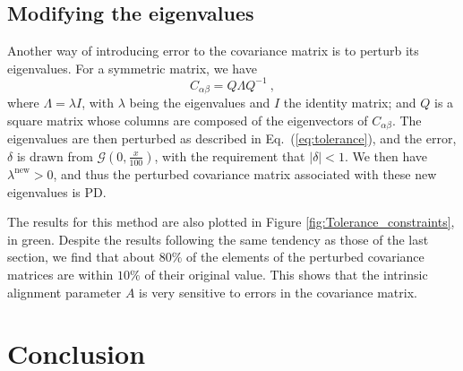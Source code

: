\documentclass[twocolumn]{\docclass}
\newcommand{\rf}[1]{Figure \ref{fig:#1}}
\newcommand{\ec}[1]{Eq.~(\ref{eq:#1})}
\newcommand\be{\begin{equation}}
\newcommand\ee{\end{equation}}
\begin{document}
	
	
	\subsection{Modifying the eigenvalues}
	
	Another way of introducing error to the covariance matrix is to perturb its eigenvalues. For a symmetric matrix, we have
	\be
	C_{\alpha \beta} = Q\Lambda Q^{-1}\ 
	,\ee
	where $\Lambda = \lambda I$, with $\lambda$ being the eigenvalues and $I$ the identity matrix; and $Q$ is a square matrix whose columns are composed of the eigenvectors of $C_{\alpha \beta}$. The eigenvalues are then perturbed as described in \ec{tolerance}, and the error, $\delta$ is drawn from $\mathcal{G}(0,\frac{x}{100})$, with the requirement that $|\delta| < 1$. We then have $\lambda^{\mathrm{new}} > 0$, and thus the perturbed covariance matrix associated with these new eigenvalues is PD. 
	
	The results for this method are also plotted in \rf{Tolerance_constraints}, in green. Despite the results following the same tendency as those of the last section, we find that about $80\%$ of the elements of the perturbed covariance matrices are within $10\%$ of their original value. This shows that the intrinsic alignment parameter $A$ is very sensitive to errors in the covariance matrix.
	
	\section{Conclusion}
	\label{sec:conclusion}
	
\end{document}
